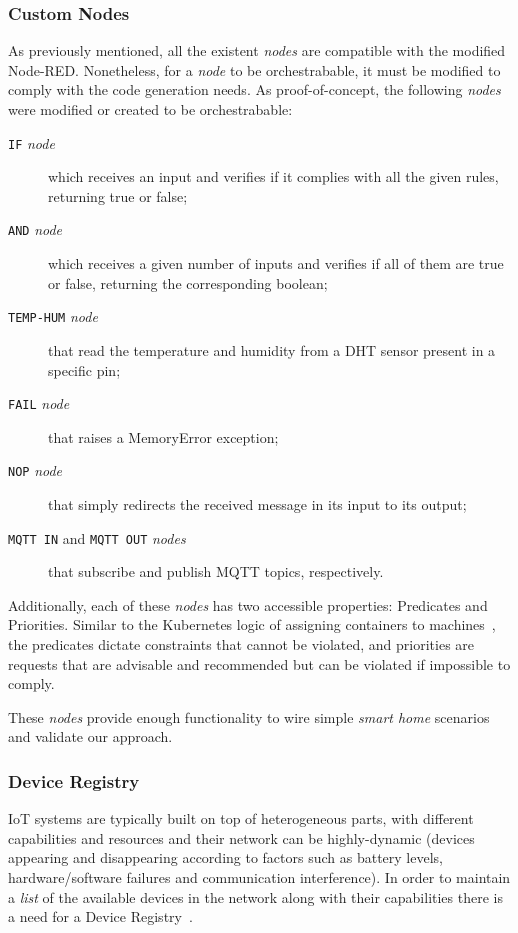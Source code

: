 \subsubsection{Custom Nodes}\label{sec:custom_nodes}

As previously mentioned, all the existent \textit{nodes} are compatible with the modified Node-RED. Nonetheless, for a \textit{node} to be orchestrabable, it must be modified to comply with the code generation needs. As proof-of-concept, the following \textit{nodes} were modified or created to be orchestrabable:
\begin{description}
    \item[\texttt{IF} \textit{node}] which receives an input and verifies if it complies with all the given rules, returning true or false;
    \item[\texttt{AND} \textit{node}] which receives a given number of inputs and verifies if all of them are true or false, returning the corresponding boolean;
    \item[\texttt{TEMP-HUM} \textit{node}] that read the temperature and humidity from a DHT sensor present in a specific pin;
    \item[\texttt{FAIL} \textit{node}] that raises a MemoryError exception;
    \item[\texttt{NOP} \textit{node}] that simply redirects the received message in its input to its output;
    \item[\texttt{MQTT IN} and \texttt{MQTT OUT} \textit{nodes}] that subscribe and publish MQTT topics, respectively.
\end{description}

Additionally, each of these \textit{nodes} has two accessible properties: Predicates and Priorities. Similar to the Kubernetes logic of assigning containers to machines~\cite{burns2018managing}, the predicates dictate constraints that cannot be violated, and priorities are requests that are advisable and recommended but can be violated if impossible to comply. 

These \textit{nodes} provide enough functionality to wire simple \textit{smart home} scenarios and validate our approach.

\subsubsection{Device Registry}
\label{sec:registry}

IoT systems are typically built on top of heterogeneous parts, with different capabilities and resources and their network can be highly-dynamic (devices appearing and disappearing according to factors such as battery levels, hardware/software failures and communication interference). In order to maintain a \textit{list} of the available devices in the network along with their capabilities there is a need for a Device Registry~\cite{Ramadas17}.

